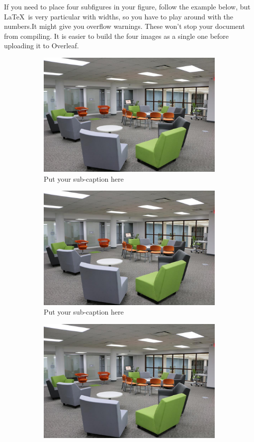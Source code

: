 \noindent If you need to place four subfigures in your figure, follow the example below, but \LaTeX\ is very particular with widths, so you have to play around with the numbers.It might give you overflow warnings. These won't stop your document from compiling. It is easier to build the four images as a single one before uploading it to Overleaf.

\begin{figure}[ht]
\begin{subfigure}{.5\textwidth}
  \centering
  \includegraphics[width=.8\linewidth]{images/2}  
  \caption{Put your sub-caption here}
  \label{fig:sub-firstfirst}
\end{subfigure}
\begin{subfigure}{.5\textwidth}
  \centering
  \includegraphics[width=.8\linewidth]{images/2}  
  \caption{Put your sub-caption here}
  \label{fig:sub-secondsecond}
\end{subfigure}
\begin{subfigure}{.5\textwidth}
  \centering
  \includegraphics[width=.8\linewidth]{images/2}  

\end{subfigure}
\end{figure}
